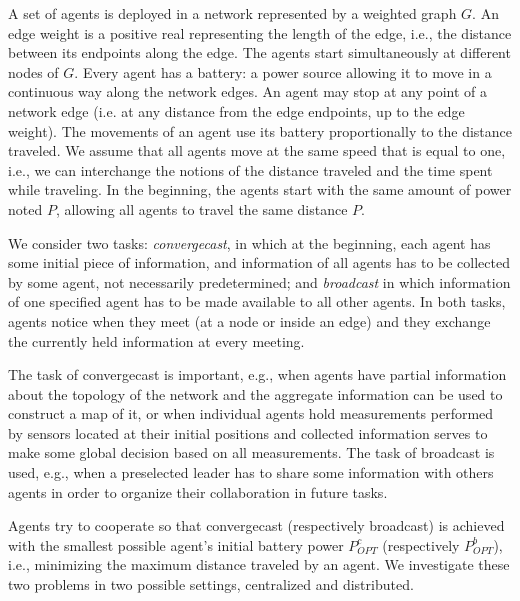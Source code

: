\documentclass{article}
\newcommand\convergecast{convergecast\xspace}
\newcommand\broadcast{broadcast\xspace}
\begin{document}
A set of agents is deployed in a network represented by a weighted graph $G$. An edge weight is a positive real representing the length of the edge, i.e., the distance between its endpoints along the edge. The agents start simultaneously at different nodes of $G$.  Every agent has a battery: a power source allowing it to move in a continuous way along the network edges. An agent may stop at any point of a network edge (i.e. at any distance from the edge endpoints, up to the edge weight). The movements of an agent use its battery proportionally to the distance traveled. We assume that all agents move at the same speed that is equal to one, i.e., we can interchange the notions of the distance traveled and the time spent while traveling. In the beginning, the agents start with the same amount of power noted $P$, allowing all agents to travel the same distance $P$. 

We consider two tasks: {\em \convergecast}, in which at the beginning, each agent has some initial piece of information, and information of all agents has to be collected by some agent, not necessarily predetermined; and {\em \broadcast} in which information of one specified agent has to be made available to all other agents. In both tasks, agents notice when they meet (at a node or inside an edge) and they exchange the currently held information at every meeting.

 The task of \convergecast is important, e.g., when agents have partial information about the topology of the network and
the aggregate information can be used to construct a map of it, or when individual agents hold measurements
performed by sensors located at their initial positions and collected information serves to make some global decision  based on all measurements. The task of \broadcast is used, e.g., when a preselected leader has to share some information with others agents in order to organize their collaboration in future tasks.

Agents try to cooperate so that {\convergecast} (respectively \broadcast) is achieved with the smallest possible agent's initial battery power $P_{OPT}^c$ (respectively $P_{OPT}^b$), i.e., minimizing the maximum distance traveled by an agent. We investigate these two problems in two possible settings, centralized and distributed. 
\end{document}
